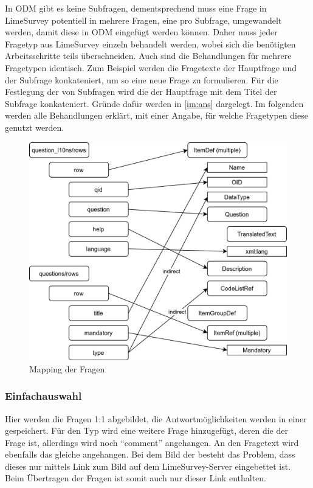 In ODM gibt es keine Subfragen, dementsprechend muss eine Frage in LimeSurvey potentiell in mehrere Fragen, eine pro Subfrage, umgewandelt werden, damit diese in ODM eingefügt werden können.
Daher muss jeder Fragetyp aus LimeSurvey einzeln behandelt werden, wobei sich die benötigten Arbeitsschritte teils überschneiden.
Auch sind die Behandlungen für mehrere Fragetypen identisch.
Zum Beispiel werden die Fragetexte der Hauptfrage und der Subfrage konkateniert, um so eine neue Frage  zu formulieren.
Für die Festlegung der  von Subfragen wird die  der Hauptfrage mit dem Titel der Subfrage konkateniert.
Gründe dafür werden in \cref{im:ans} dargelegt.
Im folgenden werden alle Behandlungen erklärt, mit einer Angabe, für welche Fragetypen diese genutzt werden.

\begin{figure}[h]
	\centering
	\includegraphics[width=.95\textwidth]{./img/m_questions.png}
	\caption{Mapping der Fragen}
	\label{fig:questions}
\end{figure}

\subsubsection{Einfachauswahl}
\label{e:sc}

Hier werden die Fragen 1:1 abgebildet, die Antwortmöglichkeiten werden in einer  gespeichert.
Für den Typ  wird eine weitere Frage hinzugefügt, deren  die  der Frage ist, allerdings wird noch \enquote{comment} angehangen.
An den Fragetext wird ebenfalls das gleiche angehangen.
Bei dem Bild der  besteht das Problem, dass dieses nur mittels Link zum Bild auf dem LimeSurvey-Server eingebettet ist.
Beim Übertragen der Fragen ist somit auch nur dieser Link enthalten.

